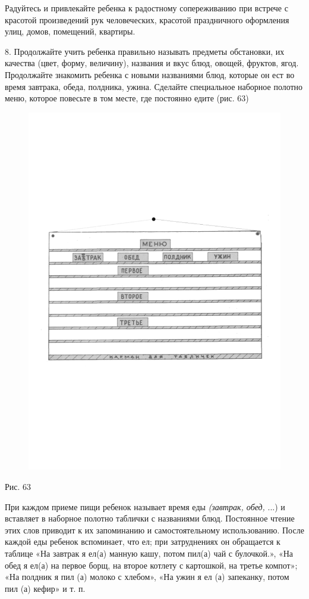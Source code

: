 \documentclass[a5paper]{book}
\renewcommand{\emph}[1]{\textit{#1}}
\begin{document}
Радуйтесь и привлекайте ребенка к радостному сопереживанию при встрече с
красотой произведений рук человеческих, красотой праздничного оформления
улиц, домов, помещений, квартиры.

8. Продолжайте учить ребенка правильно называть предметы обстановки, их
качества (цвет, форму, величину), названия и вкус блюд, овощей, фруктов,
ягод. Продолжайте знакомить ребенка с новыми названиями блюд, которые он
ест во время завтрака, обеда, полдника, ужина. Сделайте специальное
наборное полотно меню, которое повесьте в том месте, где постоянно едите
(рис. 63)

\begin{figure}
\centering
\includegraphics[width=\linewidth]{media/media/image60.png}
\end{figure}

Рис. 63

При каждом приеме пищи ребенок называет время еды \emph{(завтрак, обед,}
...) и вставляет в наборное полотно таблички с названиями блюд.
Постоянное чтение этих слов приводит к их запоминанию и самостоятельному
использованию. После каждой еды ребенок вспоминает, что ел; при
затруднениях он обращается к таблице «На завтрак я ел(а) манную кашу,
потом пил(а) чай с булочкой.», «На обед я ел(а) на первое борщ, на
второе котлету с картошкой, на третье компот»; «На полдник я пил (а)
молоко с хлебом», «На ужин я ел (а) запеканку, потом пил (а) кефир» и т.
п.
\end{document}
